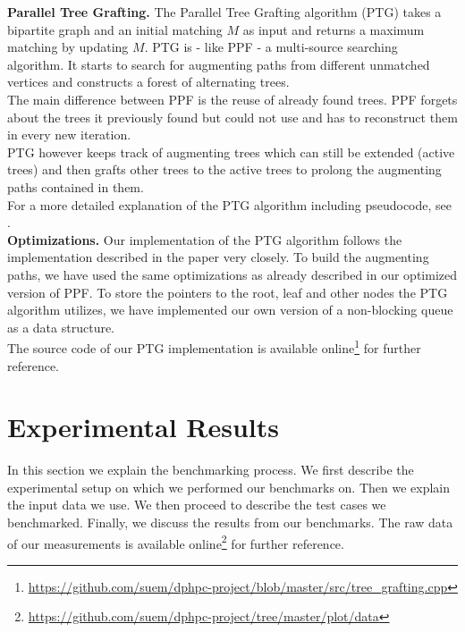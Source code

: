 \documentclass[letterpaper]{article}
\newcommand{\mypar}[1]{{\bf #1.}}
\begin{document}
\mypar{Parallel Tree Grafting} 
The Parallel Tree Grafting algorithm (PTG) takes a bipartite graph and an initial matching $M$ as input and returns a maximum matching by updating $M$.
PTG is - like PPF - a multi-source searching algorithm. It starts to search for augmenting paths from different unmatched vertices and constructs a forest of alternating trees.\\
The main difference between PPF is the reuse of already found trees. PPF forgets about the trees it previously found but could not use and has to reconstruct them in every new iteration.\\
PTG however keeps track of augmenting trees which can still be extended (active trees) and then grafts other trees to the active trees to prolong the augmenting paths contained in them.\\
For a more detailed explanation of the PTG algorithm including pseudocode, see \cite{Azad:2015}.\\

\mypar{Optimizations}
Our implementation of the PTG algorithm follows the implementation described in the paper very closely. To build the augmenting paths, we have used the same optimizations as already described in our optimized version of PPF. To store the pointers to the root, leaf and other nodes the PTG algorithm utilizes, we have implemented our own version of a non-blocking queue as a data structure. \\

The source code of our PTG implementation is available online\footnote{\url{https://github.com/suem/dphpc-project/blob/master/src/tree_grafting.cpp}} for further reference.


\section{Experimental Results}\label{sec:exp}

In this section we explain the benchmarking process. We first describe the experimental setup on which we performed our benchmarks on. 
Then we explain the input data we use. We then proceed to describe the test cases we benchmarked. Finally, we discuss the results from our benchmarks.
The raw data of our measurements is available online\footnote{\url{https://github.com/suem/dphpc-project/tree/master/plot/data}} for further reference.\\
\end{document}
